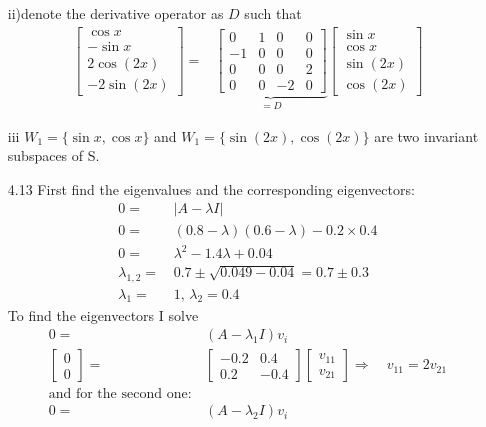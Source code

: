 \documentclass[letterpaper,12pt]{article}
\theoremstyle{definition}
\begin{document}
\begin{enumerate}
ii)denote the derivative operator as $D$  such that 
\begin{align*}\begin{bmatrix}
\cos x\\ -\sin x \\ 2\cos (2x) \\ -2\sin( 2x) 
\end{bmatrix}=&\underbrace{\begin{bmatrix}
0& 1& 0& 0\\
-1 & 0 & 0 &0 \\
0& 0& 0& 2\\
0& 0& -2& 0
\end{bmatrix}}_{=D}\begin{bmatrix}
\sin x \\ \cos x \\ \sin (2x) \\ \cos (2x)
\end{bmatrix}
\end{align*}
\item[iii]
$W_1=\{\sin x, \cos x\}$ and $W_1= \{ \sin(2x), \cos (2x)\}$ are two invariant subspaces of S.
\item[4.13]
First find the eigenvalues and the corresponding eigenvectors:
\begin{align*}
0=&\, |A-\lambda I| \\
0=& \, (0.8-\lambda)(0.6-\lambda)-0.2\times0.4  \\ 
0=&\, \lambda^2 -1.4\lambda +0.04\\
\lambda_{1,2} =&\,  0.7 \pm \sqrt{0.049 - 0.04}=0.7 \pm 0.3 \\
\lambda_1=&\, 1, \, \lambda_2 = 0.4
\end{align*}
To find the eigenvectors I solve
\begin{align*}
0=&\, (A-\lambda_1 I)v_i\\
\begin{bmatrix}
0 \\ 0
\end{bmatrix} =&\, \begin{bmatrix}
-0.2 & 0.4 \\ 0.2& -0.4
\end{bmatrix} \begin{bmatrix}
v_{11} \\ v_{21} 
\end{bmatrix} 
\Rightarrow \quad v_{11} = 2v_{21} \\
\text{and for the second one:}\\
0=&\, (A-\lambda_2 I)v_i\\

\end{align*}
\end{enumerate}
\end{document}
